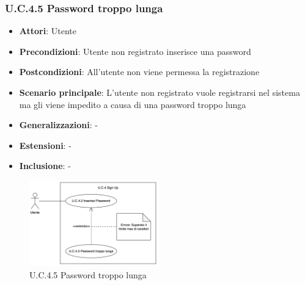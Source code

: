 \subsubsection{U.C.4.5 Password troppo lunga}
\begin{itemize}
    \item \textbf{Attori}: Utente
    \item \textbf{Precondizioni}: Utente non registrato inserisce una password
    \item \textbf{Postcondizioni}: All'utente non viene permessa la registrazione
    \item \textbf{Scenario principale}: L’utente non registrato vuole registrarsi nel sistema ma gli viene impedito a causa di una password troppo lunga
    \item \textbf{Generalizzazioni}: -
    \item \textbf{Estensioni}: -
    \item \textbf{Inclusione}: -
\end{itemize}
\begin{figure}[h!]
    \centering
    \includegraphics[width=0.5\textwidth]{img/UC4-5.png}
    \caption{U.C.4.5 Password troppo lunga}
\end{figure}
